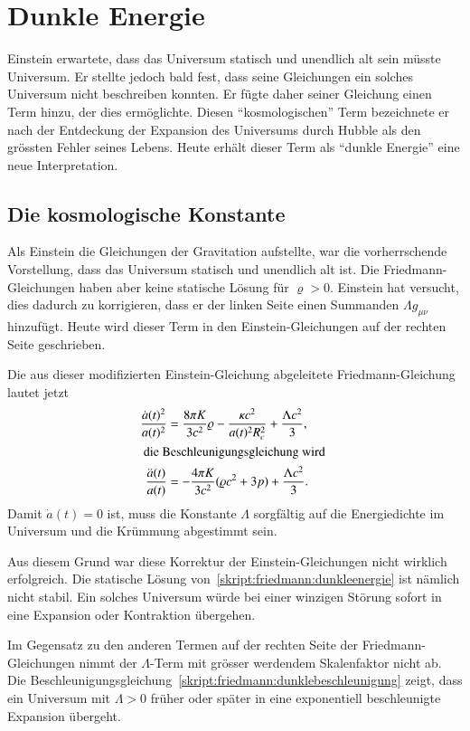 \section{Dunkle Energie}
Einstein erwartete, dass das Universum statisch und unendlich alt sein
müsste Universum.
Er stellte jedoch bald fest, dass seine Gleichungen ein solches Universum
nicht beschreiben konnten.
Er fügte daher seiner Gleichung einen Term hinzu, der dies ermöglichte.
Diesen ``kosmologischen'' Term bezeichnete er nach der
Entdeckung der Expansion des Universums durch Hubble als
den grössten Fehler seines Lebens.
Heute erhält dieser Term als ``dunkle Energie'' eine neue Interpretation.

\subsection{Die kosmologische Konstante}
Als Einstein die Gleichungen der Gravitation aufstellte, war die
vorherrschende Vorstellung, dass das Universum statisch und unendlich
alt ist.
Die Friedmann-Gleichungen haben aber keine statische Lösung
für $\varrho>0$.
Einstein hat versucht, dies dadurch zu korrigieren, dass er der
linken Seite einen Summanden $\Lambda g_{\mu\nu}$ hinzufügt.
Heute wird dieser Term in den Einstein-Gleichungen auf der rechten
Seite geschrieben.

Die aus dieser modifizierten Einstein-Gleichung abgeleitete
Friedmann-Gleichung lautet jetzt
\begin{align}
\frac{\dot a(t)^2}{a(t)^2}
&=
\frac{8\pi K}{3c^2}\varrho - \frac{\kappa c^2}{a(t)^2R_c^2} + \frac{\Lambda c^2}{3},
\label{skript:friedmann:dunkleenergie}
\\
\intertext{
die Beschleunigungsgleichung wird
}
\frac{\ddot a(t)}{a(t)}
&=
-\frac{4\pi K}{3c^2}(\varrho c^2+3p) + \frac{\Lambda c^2}{3}.
\label{skript:friedmann:dunklebeschleunigung}
\end{align}
Damit $\dot a(t)=0$ ist, muss die Konstante $\Lambda$ sorgfältig auf
die Energiedichte im Universum und die Krümmung abgestimmt sein.

Aus diesem Grund war diese Korrektur der Einstein-Gleichungen nicht
wirklich erfolgreich.
Die statische Lösung von~\eqref{skript:friedmann:dunkleenergie}
ist nämlich nicht stabil.
Ein solches Universum würde bei einer winzigen Störung sofort
in eine Expansion oder Kontraktion übergehen.

Im Gegensatz zu den anderen Termen auf der rechten Seite der
Friedmann-Gleichungen nimmt der $\Lambda$-Term mit grösser werdendem
Skalenfaktor nicht ab.
Die Beschleunigungsgleichung~\eqref{skript:friedmann:dunklebeschleunigung}
zeigt, dass ein Universum mit $\Lambda > 0$ früher oder später
in eine exponentiell beschleunigte Expansion übergeht.

